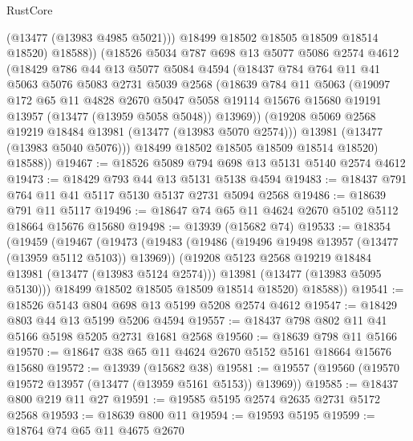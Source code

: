 \begin{lexlean}{RustCore}
\begin{coremodule}
              (@13477 (@13983 @4985 @5021)))
            @18499
            @18502
            @18505
            @18509
            @18514
            @18520)
          @18588))
      (@18526
        @5034
        @787
        @698
        @13
        @5077
        @5086
        @2574
        @4612
        (@18429
          @786
          @44
          @13
          @5077
          @5084
          @4594
          (@18437
            @784
            @764
            @11
            @41
            @5063
            @5076
            @5083
            @2731
            @5039
            @2568
            (@18639
              @784
              @11
              @5063
              (@19097
                @172
                @65
                @11
                @4828
                @2670
                @5047
                @5058
                @19114
                @15676
                @15680
                @19191
                @13957
                (@13477 (@13959 @5058 @5048))
                @13969))
            (@19208 @5069 @2568 @19219 @18484 @13981 (@13477 (@13983 @5070 @2574)))
            @13981
            (@13477 (@13983 @5040 @5076)))
          @18499
          @18502
          @18505
          @18509
          @18514
          @18520)
        @18588))
@19467 := @18526 @5089 @794 @698 @13 @5131 @5140 @2574 @4612
@19473 := @18429 @793 @44 @13 @5131 @5138 @4594
@19483 := @18437 @791 @764 @11 @41 @5117 @5130 @5137 @2731 @5094 @2568
@19486 := @18639 @791 @11 @5117
@19496 := @18647 @74 @65 @11 @4624 @2670 @5102 @5112 @18664 @15676 @15680
@19498 := @13939 (@15682 @74)
@19533 := @18354
    (@19459
      (@19467
        (@19473
          (@19483
            (@19486 (@19496 @19498 @13957 (@13477 (@13959 @5112 @5103)) @13969))
            (@19208 @5123 @2568 @19219 @18484 @13981 (@13477 (@13983 @5124 @2574)))
            @13981
            (@13477 (@13983 @5095 @5130)))
          @18499
          @18502
          @18505
          @18509
          @18514
          @18520)
        @18588))
@19541 := @18526 @5143 @804 @698 @13 @5199 @5208 @2574 @4612
@19547 := @18429 @803 @44 @13 @5199 @5206 @4594
@19557 := @18437 @798 @802 @11 @41 @5166 @5198 @5205 @2731 @1681 @2568
@19560 := @18639 @798 @11 @5166
@19570 := @18647 @38 @65 @11 @4624 @2670 @5152 @5161 @18664 @15676 @15680
@19572 := @13939 (@15682 @38)
@19581 := @19557 (@19560 (@19570 @19572 @13957 (@13477 (@13959 @5161 @5153)) @13969))
@19585 := @18437 @800 @219 @11 @27
@19591 := @19585 @5195 @2574 @2635 @2731 @5172 @2568
@19593 := @18639 @800 @11
@19594 := @19593 @5195
@19599 := @18764 @74 @65 @11 @4675 @2670

\end{coremodule}
\end{lexlean}
